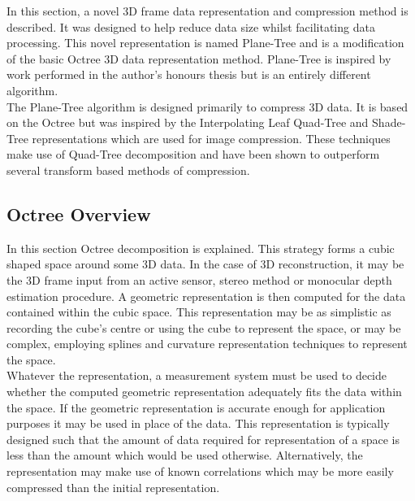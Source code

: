 In this section, a novel 3D frame data representation and compression method is described. It was designed to help reduce data size whilst facilitating data processing. This novel representation is named Plane-Tree and is a modification of the basic Octree 3D data representation method. Plane-Tree is inspired by work performed in the author's honours thesis \cite{Lincoln13Hons} but is an entirely different algorithm. \\

The Plane-Tree algorithm is designed primarily to compress 3D data. It is based on the Octree but was inspired by the Interpolating Leaf Quad-Tree and Shade-Tree representations \cite{Lincoln13Interpolating,Gonzalez07ShadeTree} which are used for image compression. These techniques make use of Quad-Tree decomposition and have been shown to outperform several transform based methods of compression. 

\subsection{Octree Overview}

In this section Octree decomposition is explained. This strategy forms a cubic shaped space around some 3D data. In the case of 3D reconstruction, it may be the 3D frame input from an active sensor, stereo method or monocular depth estimation procedure. A geometric representation is then computed for the data contained within the cubic space. This representation may be as simplistic as recording the cube's centre or using the cube to represent the space, or may be complex, employing splines and curvature representation techniques to represent the space. \\

Whatever the representation, a measurement system must be used to decide whether the computed geometric representation adequately fits the data within the space. If the geometric representation is accurate enough for application purposes it may be used in place of the data. This representation is typically designed such that the amount of data required for representation of a space is less than the amount which would be used otherwise. Alternatively, the representation may make use of known correlations which may be more easily compressed than the initial representation. \\


